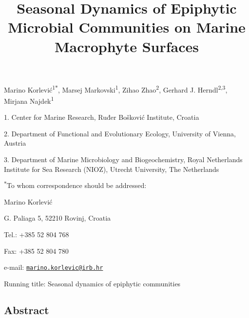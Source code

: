 \documentclass[
  12pt,
]{article}
\title{\textbf{Seasonal Dynamics of Epiphytic Microbial Communities on
Marine Macrophyte Surfaces}}
\author{}
\date{\vspace{-2.5em}}
\begin{document}
\maketitle

\vspace{20mm}

Marino Korlević\textsuperscript{1\(*\)}, Marsej
Markovski\textsuperscript{1}, Zihao Zhao\textsuperscript{2}, Gerhard J.
Herndl\textsuperscript{2,3}, Mirjana Najdek\textsuperscript{1}

1. Center for Marine Research, Ruđer Bošković Institute, Croatia

2. Department of Functional and Evolutionary Ecology, University of
Vienna, Austria

3. Department of Marine Microbiology and Biogeochemistry, Royal
Netherlands Institute for Sea Research (NIOZ), Utrecht University, The
Netherlands

\textsuperscript{\(*\)}To whom correspondence should be addressed:

Marino Korlević

G. Paliaga 5, 52210 Rovinj, Croatia

Tel.: +385 52 804 768

Fax: +385 52 804 780

e-mail:
\href{mailto:marino.korlevic@irb.hr}{\nolinkurl{marino.korlevic@irb.hr}}

Running title: Seasonal dynamics of epiphytic communities

\newpage
\linenumbers
{}
\setlength\parindent{24pt}
\doublespacing

\hypertarget{abstract}{%
\subsection{Abstract}\label{abstract}}
\end{document}
